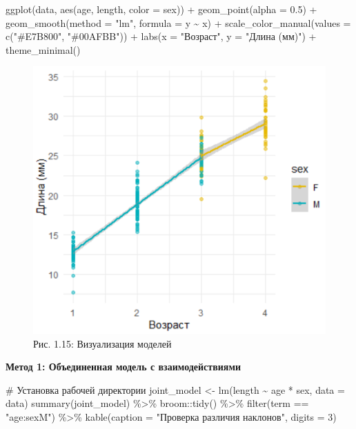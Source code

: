 \documentclass[
  letterpaper,
  DIV=11,
  numbers=noendperiod]{scrreprt}
\newenvironment{Shaded}{\begin{snugshade}}{\end{snugshade}}
\newcommand{\AttributeTok}[1]{\textcolor[rgb]{0.40,0.45,0.13}{#1}}
\newcommand{\CommentTok}[1]{\textcolor[rgb]{0.37,0.37,0.37}{#1}}
\newcommand{\DecValTok}[1]{\textcolor[rgb]{0.68,0.00,0.00}{#1}}
\newcommand{\FloatTok}[1]{\textcolor[rgb]{0.68,0.00,0.00}{#1}}
\newcommand{\FunctionTok}[1]{\textcolor[rgb]{0.28,0.35,0.67}{#1}}
\newcommand{\NormalTok}[1]{\textcolor[rgb]{0.00,0.23,0.31}{#1}}
\newcommand{\OtherTok}[1]{\textcolor[rgb]{0.00,0.23,0.31}{#1}}
\newcommand{\SpecialCharTok}[1]{\textcolor[rgb]{0.37,0.37,0.37}{#1}}
\newcommand{\StringTok}[1]{\textcolor[rgb]{0.13,0.47,0.30}{#1}}
\begin{document}
\begin{Shaded}
\begin{Highlighting}[]
\FunctionTok{ggplot}\NormalTok{(data, }\FunctionTok{aes}\NormalTok{(age, length, }\AttributeTok{color =}\NormalTok{ sex)) }\SpecialCharTok{+}
  \FunctionTok{geom\_point}\NormalTok{(}\AttributeTok{alpha =} \FloatTok{0.5}\NormalTok{) }\SpecialCharTok{+}
  \FunctionTok{geom\_smooth}\NormalTok{(}\AttributeTok{method =} \StringTok{"lm"}\NormalTok{, }\AttributeTok{formula =}\NormalTok{ y }\SpecialCharTok{\textasciitilde{}}\NormalTok{ x) }\SpecialCharTok{+}
  \FunctionTok{scale\_color\_manual}\NormalTok{(}\AttributeTok{values =} \FunctionTok{c}\NormalTok{(}\StringTok{"\#E7B800"}\NormalTok{, }\StringTok{"\#00AFBB"}\NormalTok{)) }\SpecialCharTok{+}
  \FunctionTok{labs}\NormalTok{(}\AttributeTok{x =} \StringTok{"Возраст"}\NormalTok{, }\AttributeTok{y =} \StringTok{"Длина (мм)"}\NormalTok{) }\SpecialCharTok{+}
  \FunctionTok{theme\_minimal}\NormalTok{()}
\end{Highlighting}
\end{Shaded}

\begin{figure}[H]

{\centering \includegraphics[width=0.6\linewidth,height=\textheight,keepaspectratio]{images/comparison_shrimp.PNG}

}

\caption{Рис. 1.15: Визуализация моделей}

\end{figure}%

\textbf{Метод 1: Объединенная модель с взаимодействиями}

\begin{Shaded}
\begin{Highlighting}[]
\CommentTok{\# Установка рабочей директории}
\NormalTok{joint\_model }\OtherTok{\textless{}{-}} \FunctionTok{lm}\NormalTok{(length }\SpecialCharTok{\textasciitilde{}}\NormalTok{ age }\SpecialCharTok{*}\NormalTok{ sex, }\AttributeTok{data =}\NormalTok{ data)}
\FunctionTok{summary}\NormalTok{(joint\_model) }\SpecialCharTok{\%\textgreater{}\%} 
\NormalTok{  broom}\SpecialCharTok{::}\FunctionTok{tidy}\NormalTok{() }\SpecialCharTok{\%\textgreater{}\%} 
  \FunctionTok{filter}\NormalTok{(term }\SpecialCharTok{==} \StringTok{"age:sexM"}\NormalTok{) }\SpecialCharTok{\%\textgreater{}\%} 
  \FunctionTok{kable}\NormalTok{(}\AttributeTok{caption =} \StringTok{"Проверка различия наклонов"}\NormalTok{, }\AttributeTok{digits =} \DecValTok{3}\NormalTok{)}
\end{Highlighting}
\end{Shaded}
\end{document}
